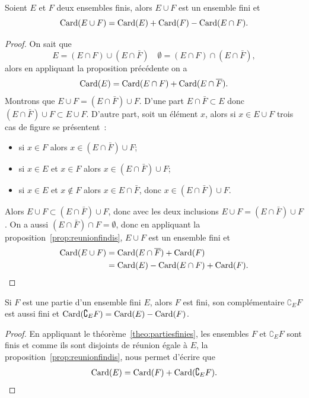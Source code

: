 \begin{prop}
  Soient \(E\) et \(F\) deux ensembles finis, alors \(E\cup F\) est un ensemble
  fini et
  \begin{equation}
    \operatorname{Card}(E\cup F) = \operatorname{Card}(E) + \operatorname{Card}(F) - \operatorname{Card}(E\cap F).
  \end{equation}
\end{prop}

\begin{proof}
  On sait que
  \begin{equation}
    E = (E\cap F)\cup (E\cap \bar{F}) \quad \emptyset = (E\cap F)\cap (E\cap
    \bar{F}),
  \end{equation} alors en appliquant la proposition précédente on a
  \begin{equation}
    \operatorname{Card}(E) = \operatorname{Card}(E\cap F)+\operatorname{Card}(E\cap \overline{F}).
  \end{equation}
  Montrons que \(E\cup F =(E\cap \bar{F}) \cup F\). D'une part \(E \cap \bar{F}
  \subset E\) donc \((E\cap \bar{F}) \cup F \subset E\cup F\). D'autre part,
  soit un élément \(x\), alors si \(x \in E \cup F\) trois cas de figure se
  présentent~:
  \begin{itemize}
    \item si \(x\in F\) alors \(x \in (E\cap \bar{F}) \cup F\);
    \item si \(x \in E\) et \(x \in F\) alors \(x \in (E\cap \bar{F}) \cup F\);
    \item si \(x \in E\) et \(x \notin F\) alors \(x \in E\cap \bar{F}\), donc
      \(x \in (E\cap \bar{F}) \cup F\).
  \end{itemize}
  Alors \(E\cup F \subset (E \cap \bar{F})\cup F\), donc avec les deux
  inclusions \(E\cup F =(E\cap \bar{F}) \cup F\). On a aussi \((E\cap
  \bar{F})\cap F = \emptyset\), donc en appliquant la
  proposition~\ref{prop:reunionfindis}, \(E\cup F\) est un ensemble fini et
  \begin{align}
    \operatorname{Card}(E\cup F)& = \operatorname{Card}(E\cap \overline{F})+\operatorname{Card}(F)\\ & = \operatorname{Card}(E) - \operatorname{Card}(E\cap
    F)+\operatorname{Card}(F).
  \end{align}
\end{proof}

\begin{prop}
  Si \(F\) est une partie d'un ensemble fini \(E\), alors \(F\) est fini, son
  complémentaire \(\complement_E F\) est aussi fini et \(\operatorname{Card}(\complement_E F)
  = \operatorname{Card}(E) - \operatorname{Card}(F)\).
\end{prop}

\begin{proof}
  En appliquant le théorème~\ref{theo:partiesfinies}, les ensembles \(F\) et
  \(\complement_E F\) sont finis et comme ils sont disjoints de réunion égale à
  \(E\), la proposition~\ref{prop:reunionfindis}, nous permet d'écrire que
  \begin{equation}
    \operatorname{Card}(E) = \operatorname{Card}(F) + \operatorname{Card}(\complement_E F).
  \end{equation}
\end{proof}

